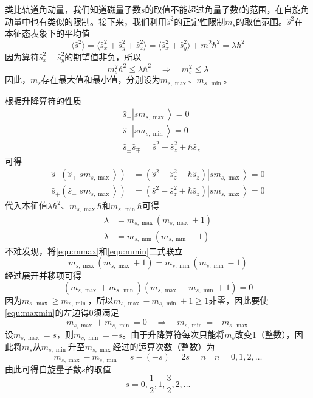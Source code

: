 \documentclass[12pt]{article}
\begin{document}
类比轨道角动量，我们知道磁量子数$s$的取值不能超过角量子数$l$的范围，在自旋角动量中也有类似的限制。接下来，我们利用$\hat{s}^2$的正定性限制$m_s$的取值范围。$\hat{s}^2$在本征态表象下的平均值
\begin{equation}
    \langle\hat{s}^2\rangle=\langle\hat{s}_x^2+\hat{s}_y^2+\hat{s}_z^2\rangle=\langle\hat{s}_x^2+\hat{s}_y^2\rangle+m^2\hbar^2=\lambda\hbar^2
\end{equation}
因为算符$\hat{s}_x^2+\hat{s}_y^2$的期望值非负，所以
\begin{equation}
    m_s^2\hbar^2\leq\lambda\hbar^2\quad\Longrightarrow\quad m_s^2\leq\lambda
\end{equation}
因此，$m_s$存在最大值和最小值，分别设为$m_{s,\max}$、$m_{s,\min}$。

根据升降算符的性质
\begin{align}
    &\hat{s}_+\left|sm_{s,\max}\right\rangle=0\\
    &\hat{s}_-\left|sm_{s,\min}\right\rangle=0\\
    &\hat{s}_\pm\hat{s}_\mp=\hat{s}^2-\hat{s}_z^2\pm\hbar\hat{s}_z
\end{align}
可得
\begin{align}
    \hat{s}_-\left(\hat{s}_+\left|sm_{s,\max}\right\rangle\right)&=(\hat{s}^2-\hat{s}_z^2-\hbar\hat{s}_z)\left|sm_{s,\max}\right\rangle=0\\
    \hat{s}_+\left(\hat{s}_-\left|sm_{s,\max}\right\rangle\right)&=(\hat{s}^2-\hat{s}_z^2+\hbar\hat{s}_z)\left|sm_{s,\max}\right\rangle=0
\end{align}
代入本征值$\lambda\hbar^2$、$m_{s,\max}\hbar$和$m_{s,\min}\hbar$可得
\begin{align}
    \lambda&=m_{s,\max}(m_{s,\max}+1) \label{equ:mmax}\\
    \lambda&=m_{s,\min}(m_{s,\min}-1) \label{equ:mmin}
\end{align}
不难发现，将\autoref{equ:mmax}和\autoref{equ:mmin}二式联立
\begin{equation}
    m_{s,\max}(m_{s,\max}+1)=m_{s,\min}(m_{s,\min}-1)
\end{equation}
经过展开并移项可得
\begin{equation}
    (m_{s,\max}+m_{s,\min})(m_{s,\max}-m_{s,\min}+1)=0
    \label{equ:maxmin}
\end{equation}
因为$m_{s,\max}\geq m_{s,\min}$，所以$m_{s,\max}-m_{s,\min}+1\geq1$非零，因此要使\autoref{equ:maxmin}的左边得0须满足
\begin{equation}
    m_{s,\max}+m_{s,\min}=0\quad\Longrightarrow\quad m_{s,\min}=-m_{s,\max}
\end{equation}
设$m_{s,\max}=s$，则$m_{s,\min}=-s$。由于升降算符每次只能将$m_s$改变1（整数），因此将$m_s$从$m_{s,\min}$升至$m_{s,\max}$经过的运算次数（整数）为
\begin{equation}
    m_{s,\max}-m_{s,\min}=s-(-s)=2s=n\quad n=0,1,2,\dots
\end{equation}
由此可得自旋量子数$s$的取值
\begin{equation}
    s=0,\frac{1}{2},1,\frac{3}{2},2,\dots
\end{equation}
\end{document}
